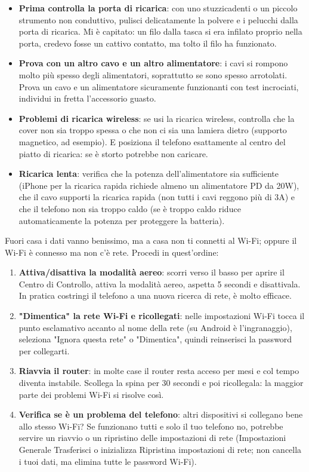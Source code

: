 \begin{itemize}
  \item \textbf{Prima controlla la porta di ricarica}: con uno stuzzicadenti o un piccolo strumento non conduttivo, pulisci delicatamente la polvere e i pelucchi dalla porta di ricarica. Mi è capitato: un filo dalla tasca si era infilato proprio nella porta, credevo fosse un cattivo contatto, ma tolto il filo ha funzionato.
  \item \textbf{Prova con un altro cavo e un altro alimentatore}: i cavi si rompono molto più spesso degli alimentatori, soprattutto se sono spesso arrotolati. Prova un cavo e un alimentatore sicuramente funzionanti con test incrociati, individui in fretta l'accessorio guasto.
  \item \textbf{Problemi di ricarica wireless}: se usi la ricarica wireless, controlla che la cover non sia troppo spessa o che non ci sia una lamiera dietro (supporto magnetico, ad esempio). E posiziona il telefono esattamente al centro del piatto di ricarica: se è storto potrebbe non caricare.
  \item \textbf{Ricarica lenta}: verifica che la potenza dell'alimentatore sia sufficiente (iPhone per la ricarica rapida richiede almeno un alimentatore PD da 20W), che il cavo supporti la ricarica rapida (non tutti i cavi reggono più di 3A) e che il telefono non sia troppo caldo (se è troppo caldo riduce automaticamente la potenza per proteggere la batteria).
\end{itemize}


Fuori casa i dati vanno benissimo, ma a casa non ti connetti al Wi-Fi; oppure il Wi-Fi è connesso ma non c'è rete. Procedi in quest'ordine:

\begin{enumerate}
  \item \textbf{Attiva/disattiva la modalità aereo}: scorri verso il basso per aprire il Centro di Controllo, attiva la modalità aereo, aspetta 5 secondi e disattivala. In pratica costringi il telefono a una nuova ricerca di rete, è molto efficace.
  \item \textbf{"Dimentica" la rete Wi-Fi e ricollegati}: nelle impostazioni Wi-Fi tocca il punto esclamativo accanto al nome della rete (su Android è l'ingranaggio), seleziona "Ignora questa rete" o "Dimentica", quindi reinserisci la password per collegarti.
  \item \textbf{Riavvia il router}: in molte case il router resta acceso per mesi e col tempo diventa instabile. Scollega la spina per 30 secondi e poi ricollegala: la maggior parte dei problemi Wi-Fi si risolve così.
  \item \textbf{Verifica se è un problema del telefono}: altri dispositivi si collegano bene allo stesso Wi-Fi? Se funzionano tutti e solo il tuo telefono no, potrebbe servire un riavvio o un ripristino delle impostazioni di rete (Impostazioni Generale Trasferisci o inizializza Ripristina impostazioni di rete; non cancella i tuoi dati, ma elimina tutte le password Wi-Fi).
\end{enumerate}


